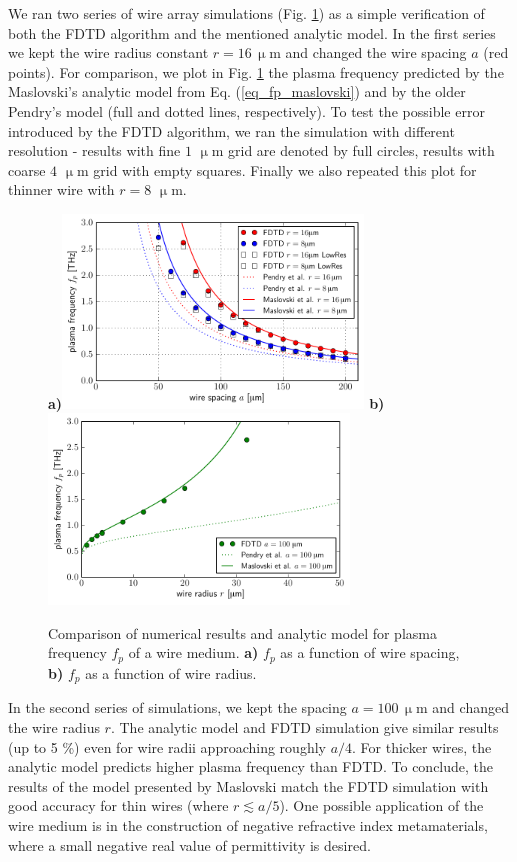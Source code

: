 {We ran two series of wire array simulations (Fig. \ref{fg_omegap_a}) as a simple verification of both the FDTD algorithm and the mentioned analytic model. In the first series we kept the wire radius constant $r = 16\,\upmu$m  and changed the wire spacing $a$ (red points). For comparison, we plot in Fig. \ref{fg_omegap_a} the plasma frequency predicted by the Maslovski's analytic model\cite{maslovski2002wire} from Eq. (\ref{eq_fp_maslovski}) and by the older Pendry's model \cite{pendry1996extremely} (full and dotted lines, respectively). To test the possible error introduced by the FDTD algorithm, we ran the simulation with different resolution - results with fine $1$ $\upmu$m grid are denoted by full circles, results with coarse $4$ $\upmu$m grid with empty squares. Finally we also repeated this plot for thinner wire with $r = 8$ $\upmu$m.
\begin{figure}[ht] \caption{Comparison of numerical results and analytic model for plasma frequency $f_p$ of a wire medium. \textbf{a)} $f_p$ as a function of wire spacing, \textbf{b)} $f_p$ as a function of wire radius. } \label{fg_omegap_a} \centering 
\textbf{a)}\includegraphics[width=8cm]{img/EWire_plasmaF_spacingscan.pdf}
\textbf{b)}\includegraphics[width=8cm]{img/EWire_plasmaF_radiusscan.pdf}
\end{figure}

In the second series of simulations, we kept the spacing $a = 100\,\upmu$m and changed the wire radius $r$. The analytic model\cite{maslovski2002wire} and FDTD simulation give similar results (up to 5 \%) even for wire radii approaching roughly $a/4$. For thicker wires, the analytic model predicts higher plasma frequency than FDTD.  To conclude, the results of the model presented by Maslovski match the FDTD simulation with good accuracy for thin wires (where $r \lesssim a/5$). One possible application of the wire medium is in the construction of negative refractive index metamaterials, where a small negative real value of permittivity is desired.
}


